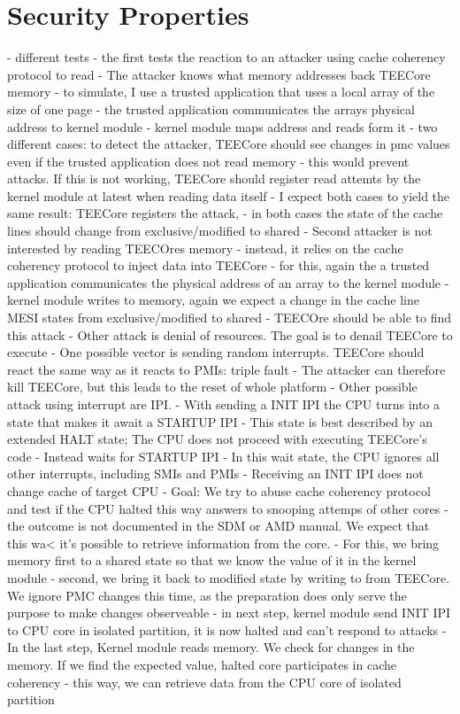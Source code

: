 \section{Security Properties}
- different tests
- the first tests the reaction to an attacker using cache coherency protocol to read
- The attacker knows what memory addresses back TEECore memory
- to simulate, I use a trusted application that uses a local array of the size of one page
- the trusted application communicates the arrays physical address to kernel module
- kernel module maps address and reads form it
- two different cases: to detect the attacker, TEECore should see changes in pmc values even if the trusted application does not read memory
- this would prevent attacks. If this is not working, TEECore should register read attemts by the kernel module at latest when reading data itself
- I expect both cases to yield the same result: TEECore registers the attack,
- in both cases the state of the cache lines should change from exclusive/modified to shared
- Second attacker is not interested by reading TEECOres memory
- instead, it relies on the cache coherency protocol to inject data into TEECore
- for this, again the a trusted application communicates the physical address of an array to the kernel module
- kernel module writes to memory, again we expect a change in the cache line MESI states from exclusive/modified to shared
- TEECOre should be able to find this attack
- Other attack is denial of resources. The goal is to denail TEECore to execute
- One possible vector is sending random interrupts. TEECore should react the same way as it reacts to PMIs: triple fault
- The attacker can therefore kill TEECore, but this leads to the reset of whole platform
- Other possible attack using interrupt are IPI.
- With sending a INIT IPI the CPU turns into a state that makes it await a STARTUP IPI
- This state is best described by an extended HALT state; The CPU does not proceed with executing TEECore's code
- Instead waits for STARTUP IPI
- In this wait state, the CPU ignores all other interrupts, including SMIs and PMIs
- Receiving an INIT IPI does not change cache of target CPU
- Goal: We try to abuse cache coherency protocol and test if the CPU halted this way answers to snooping attemps of other cores
- the outcome is not documented in the SDM or AMD manual. We expect that this wa< it's possible to retrieve information from the core.
- For this, we bring memory first to a shared state so that we know the value of it in the kernel module
- second, we bring it back to modified state by writing to from TEECore. We ignore PMC changes this time, as the preparation does only serve the purpose to make changes observeable
- in next step, kernel module send INIT IPI to CPU core in isolated partition, it is now halted and can't respond to attacks
- In the last step, Kernel module reads memory. We check for changes in the memory. If we find the expected value, halted core participates in cache coherency
- this way, we can retrieve data from the CPU core of isolated partition

